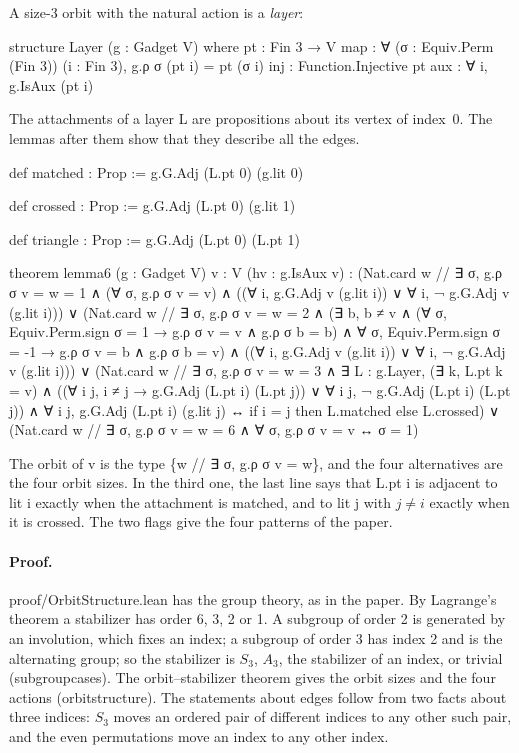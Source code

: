 \documentclass[11pt,a4paper]{article}
\newcommand{\leanus}{\textunderscore\allowbreak}
\newcommand{\lean}[1]{{\ttfamily\let\_\leanus #1}}
\begin{document}
\smallskip
A size-3 orbit with the natural action is a \emph{layer}:
\begin{code}
structure Layer (g : Gadget V) where
  pt : Fin 3 → V
  map : ∀ (σ : Equiv.Perm (Fin 3)) (i : Fin 3), g.ρ σ (pt i) = pt (σ i)
  inj : Function.Injective pt
  aux : ∀ i, g.IsAux (pt i)
\end{code}
The attachments of a layer \lean{L} are propositions about its vertex of
index~0. The lemmas after them show that they describe all the edges.
\begin{code}
def matched : Prop := g.G.Adj (L.pt 0) (g.lit 0)

def crossed : Prop := g.G.Adj (L.pt 0) (g.lit 1)

def triangle : Prop := g.G.Adj (L.pt 0) (L.pt 1)

theorem lemma6 (g : Gadget V) {v : V} (hv : g.IsAux v) :
    (Nat.card {w // ∃ σ, g.ρ σ v = w} = 1 ∧ (∀ σ, g.ρ σ v = v) ∧
      ((∀ i, g.G.Adj v (g.lit i)) ∨ ∀ i, ¬ g.G.Adj v (g.lit i))) ∨
    (Nat.card {w // ∃ σ, g.ρ σ v = w} = 2 ∧
      (∃ b, b ≠ v ∧ (∀ σ, Equiv.Perm.sign σ = 1 → g.ρ σ v = v ∧ g.ρ σ b = b) ∧
        ∀ σ, Equiv.Perm.sign σ = -1 → g.ρ σ v = b ∧ g.ρ σ b = v) ∧
      ((∀ i, g.G.Adj v (g.lit i)) ∨ ∀ i, ¬ g.G.Adj v (g.lit i))) ∨
    (Nat.card {w // ∃ σ, g.ρ σ v = w} = 3 ∧ ∃ L : g.Layer, (∃ k, L.pt k = v) ∧
      ((∀ i j, i ≠ j → g.G.Adj (L.pt i) (L.pt j)) ∨ ∀ i j, ¬ g.G.Adj (L.pt i) (L.pt j)) ∧
      ∀ i j, g.G.Adj (L.pt i) (g.lit j) ↔ if i = j then L.matched else L.crossed) ∨
    (Nat.card {w // ∃ σ, g.ρ σ v = w} = 6 ∧ ∀ σ, g.ρ σ v = v ↔ σ = 1)
\end{code}
The orbit of \lean{v} is the type \lean{\{w // ∃ σ, g.ρ σ v = w\}}, and the
four alternatives are the four orbit sizes. In the third one, the last line
says that \lean{L.pt i} is adjacent to \lean{lit i} exactly when the
attachment is matched, and to \lean{lit j} with $j\ne i$ exactly when it is
crossed. The two flags give the four patterns of the paper.

\paragraph{Proof.} \lean{proof/OrbitStructure.lean} has the group theory, as
in the paper. By Lagrange's theorem a stabilizer has order 6, 3, 2 or 1. A
subgroup of order 2 is generated by an involution, which fixes an index; a
subgroup of order 3 has index 2 and is the alternating group; so the
stabilizer is $S_3$, $A_3$, the stabilizer of an index, or trivial
(\lean{subgroup\_cases}). The orbit--stabilizer theorem gives the orbit
sizes and the four actions (\lean{orbit\_structure}). The statements about
edges follow from two facts about three indices: $S_3$ moves an ordered pair
of different indices to any other such pair, and the even permutations move
an index to any other index.
\end{document}
